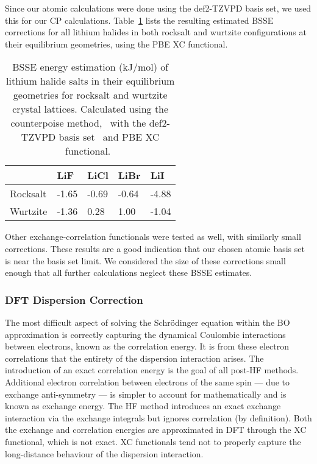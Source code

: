 \documentclass[titlepage,11pt]{article}
\begin{document}
Since our atomic calculations were done using the def2-TZVPD basis set, we used this for our CP calculations. Table~\ref{tab:BSSE} lists the resulting estimated BSSE corrections for all lithium halides in both rocksalt and wurtzite configurations at their equilibrium geometries, using the PBE XC functional.
\begin{table}[]
	\begin{center}
	\begin{tabular}{l|llll}
		\textbf{} & LiF & LiCl & LiBr & LiI \\ \hline
		Rocksalt & -1.65 & -0.69 & -0.64 & -4.88 \\
		Wurtzite & -1.36 &  0.28 &  1.00 & -1.04
	\end{tabular}
	\end{center}
	\caption{\label{tab:BSSE} BSSE energy estimation (kJ/mol) of lithium halide salts in their equilibrium geometries for rocksalt and wurtzite crystal lattices. Calculated using the counterpoise method,~\cite{boys1970calculation} with the def2-TZVPD basis set~\cite{Rappoport2010,Peintinger2013} and PBE XC functional.~\cite{Perdew1996}}
\end{table}
Other exchange-correlation functionals were tested as well, with similarly small corrections. These results are a good indication that our chosen atomic basis set is near the basis set limit. We considered the size of these corrections small enough that all further calculations neglect these BSSE estimates.

\subsubsection{DFT Dispersion Correction}

The most difficult aspect of solving the Schr\"{o}dinger equation within the BO approximation is correctly capturing the dynamical Coulombic interactions between electrons, known as the correlation energy. It is from these electron correlations that the entirety of the dispersion interaction arises. The introduction of an exact correlation energy is the goal of all post-HF methods. Additional electron correlation between electrons of the same spin --- due to exchange anti-symmetry --- is simpler to account for mathematically and is known as exchange energy. The HF method introduces an exact exchange interaction via the exchange integrals but ignores correlation (by definition). Both the exchange and correlation energies are approximated in DFT through the XC functional, which is not exact. XC functionals tend not to properly capture the long-distance behaviour of the dispersion interaction.~\cite{grimme2016dispersion}
\end{document}
